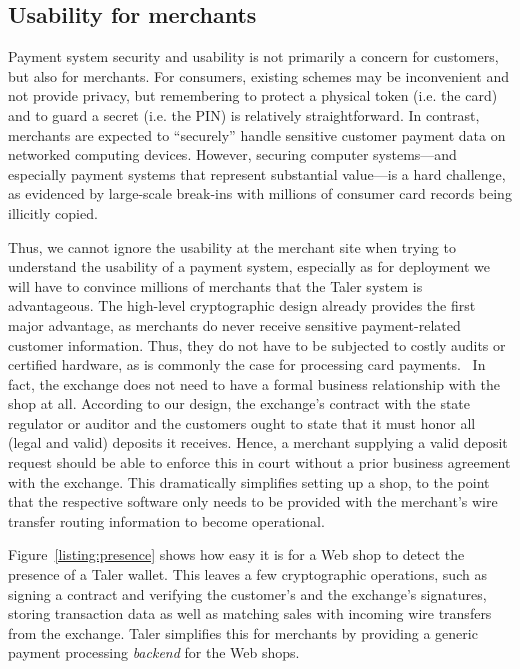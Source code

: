 \documentclass{IEEEtran}
\begin{document}
\subsection{Usability for merchants}

Payment system security and usability is not primarily a concern for
customers, but also for merchants.  For consumers, existing schemes
may be inconvenient and not provide privacy, but remembering to
protect a physical token (i.e. the card) and to guard a secret
(i.e. the PIN) is relatively straightforward.  In contrast, merchants
are expected to ``securely'' handle sensitive customer payment data on
networked computing devices.  However, securing computer systems---and
especially payment systems that represent substantial value---is a
hard challenge, as evidenced by large-scale break-ins with millions of
consumer card records being illicitly copied.~\cite{target}

Thus, we cannot ignore the usability at the merchant site when trying
to understand the usability of a payment system, especially as for
deployment we will have to convince millions of merchants that the
Taler system is advantageous.  The high-level cryptographic design
already provides the first major advantage, as merchants do never
receive sensitive payment-related customer information.  Thus, they do
not have to be subjected to costly audits or certified hardware, as is
commonly the case for processing card payments.~\cite{pcidss} In fact,
the exchange does not need to have a formal business relationship with
the shop at all.  According to our design, the exchange's contract
with the state regulator or auditor and the customers ought to state
that it must honor all (legal and valid) deposits it receives.  Hence,
a merchant supplying a valid deposit request should be able to enforce
this in court without a prior business agreement with the exchange.
This dramatically simplifies setting up a shop, to the point that the
respective software only needs to be provided with the merchant's wire
transfer routing information to become operational.

Figure~\ref{listing:presence} shows how easy it is for a Web shop to
detect the presence of a Taler wallet.  This leaves a few cryptographic
operations, such as signing a contract and verifying the customer's and
the exchange's signatures, storing transaction data as well as matching
sales with incoming wire transfers from the exchange.  Taler simplifies this
for merchants by providing a generic payment processing {\em backend} for
the Web shops.
\end{document}
